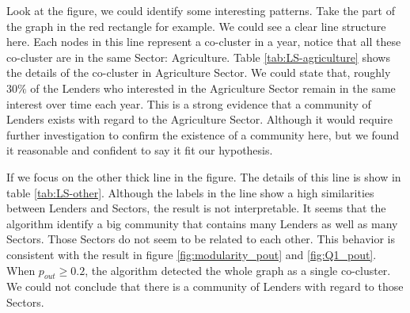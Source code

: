 Look at the figure, we could identify some interesting patterns.
Take the part of the graph in the red rectangle for example.
We could see a clear line structure here.
Each nodes in this line represent a co-cluster in a year,
notice that all these co-cluster are in the same Sector: Agriculture.
Table \ref{tab:LS-agriculture} shows the details of the co-cluster in Agriculture Sector.
We could state that, roughly $30\%$ of the Lenders who interested in the Agriculture Sector
remain in the same interest over time each year.
This is a strong evidence that a community of Lenders exists with regard to the Agriculture Sector.
Although it would require further investigation to confirm the existence of a community here,
but we found it reasonable and confident to say it fit our hypothesis.

\begin{table}[H]
	\centering
	\caption{A result in Lender-Sector community detection}
	\label{tab:LS-agriculture}
\end{table}

If we focus on the other thick line in the figure.
The details of this line is show in table \ref{tab:LS-other}.
Although the labels in the line show a high similarities between Lenders and Sectors,
the result is not interpretable.
It seems that the algorithm identify a big community that contains many Lenders as well as many Sectors.
Those Sectors do not seem to be related to each other.
This behavior is consistent with the result in figure \ref{fig:modularity_pout} and \ref{fig:Q1_pout}.
When $p_{out} \ge 0.2$, the algorithm detected the whole graph as a single co-cluster.
We could not conclude that there is a community of Lenders with regard to those Sectors.

